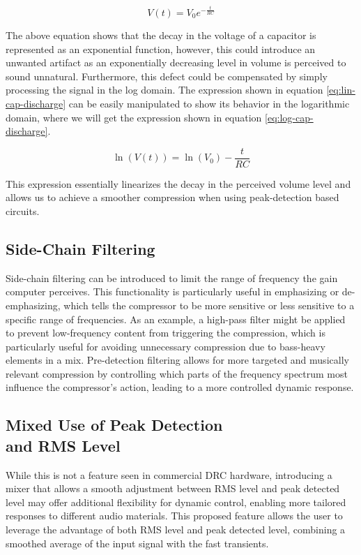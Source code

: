 \documentclass[10pt]{article}
\begin{document}
\begin{multicols*}{2}
                    \begin{equation}\label{eq:lin-cap-discharge}
                        V(t) = V_0 e^{-\frac{t}{RC}}
                    \end{equation}    
                
                \noindent The above equation shows that the decay in the voltage of a capacitor is represented as an exponential function, however, this could introduce an unwanted artifact as an exponentially decreasing level in volume is perceived to sound unnatural. Furthermore, this defect could be compensated by simply processing the signal in the log domain. The expression shown in equation \ref{eq:lin-cap-discharge} can be easily manipulated to show its behavior in the logarithmic domain, where we will get the expression shown in equation \ref{eq:log-cap-discharge}.
                
                    \begin{equation}\label{eq:log-cap-discharge}
                        \ln(V(t)) = \ln(V_0) - \frac{t}{RC}
                    \end{equation}
                
                \noindent This expression essentially linearizes the decay in the perceived volume level and allows us to achieve a smoother compression when using peak-detection based circuits.
                

            \subsection{Side-Chain Filtering}
                Side-chain filtering can be introduced to limit the range of frequency the gain computer perceives. This functionality is particularly useful in emphasizing or de-emphasizing, which tells the compressor to be more sensitive or less sensitive to a specific range of frequencies. As an example, a high-pass filter might be applied to prevent low-frequency content from triggering the compression, which is particularly useful for avoiding unnecessary compression due to bass-heavy elements in a mix. Pre-detection filtering allows for more targeted and musically relevant compression by controlling which parts of the frequency spectrum most influence the compressor's action, leading to a more controlled dynamic response.\cite{side-chain-filtering}
                
            \subsection[Mixed Use of Peak Detection and RMS Level]{Mixed Use of Peak Detection\\and RMS Level}
                While this is not a feature seen in commercial DRC hardware, introducing a mixer that allows a smooth adjustment between RMS level and peak detected level may offer additional flexibility for dynamic control, enabling more tailored responses to different audio materials.
                This proposed feature allows the user to leverage the advantage of both RMS level and peak detected level, combining a smoothed average of the input signal with the fast transients.
            

\end{multicols*}
\end{document}
